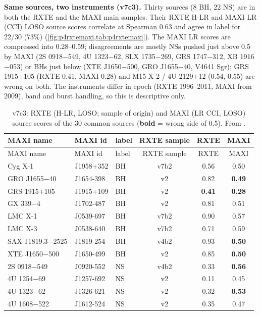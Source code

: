\textbf{Same sources, two instruments (v7c3).} \Descriptive{} Thirty sources (8 BH, 22 NS) are in both the RXTE and the MAXI
main samples. Their RXTE H-LR and MAXI LR (CCI) LOSO source scores correlate at Spearman 0.63 and agree in label for 22/30 (73\%)
(\cref{fig:p4rxtemaxi,tab:p4rxtemaxi}). The MAXI LR scores are compressed into 0.28--0.59; disagreements are mostly NSs pushed
just above 0.5 by MAXI (2S 0918$-$549, 4U 1323$-$62, SLX 1735$-$269, GRS 1747$-$312, XB 1916$-$053) or BHs just below
(XTE J1650$-$500, GRO J1655$-$40, V4641 Sgr); GRS 1915+105 (RXTE 0.41, MAXI 0.28) and M15 X-2 / 4U 2129+12 (0.54, 0.55) are wrong on
both. The instruments differ in epoch (RXTE 1996--2011, MAXI from 2009), band and burst handling, so this is descriptive only.

{\footnotesize
\begin{longtable}{@{}lllccc@{}}
\caption[RXTE vs MAXI]{v7c3: RXTE (H-LR, LOSO; sample of origin) and MAXI (LR CCI, LOSO) source scores of the 30 common sources
(\textbf{bold} = wrong side of 0.5). From .}\label{tab:p4rxtemaxi}\\
\toprule
MAXI name & MAXI id & label & RXTE sample & RXTE & MAXI \\
\midrule\endfirsthead
\toprule MAXI name & MAXI id & label & RXTE sample & RXTE & MAXI \\ \midrule\endhead
\bottomrule\endfoot
Cyg X-1 & J1958+352 & BH & v7b2 & 0.56 & 0.50 \\
GRO J1655$-$40 & J1654-398 & BH & v2 & 0.82 & \textbf{0.49} \\
GRS 1915+105 & J1915+109 & BH & v2 & \textbf{0.41} & \textbf{0.28} \\
GX 339$-$4 & J1702-487 & BH & v2 & 0.81 & 0.51 \\
LMC X-1 & J0539-697 & BH & v7b2 & 0.90 & 0.57 \\
LMC X-3 & J0538-640 & BH & v7b2 & 0.71 & 0.59 \\
SAX J1819.3$-$2525 & J1819-254 & BH & v4b2 & 0.93 & \textbf{0.50} \\
XTE J1650$-$500 & J1650-499 & BH & v2 & 0.85 & \textbf{0.50} \\
2S 0918$-$549 & J0920-552 & NS & v4b2 & 0.33 & \textbf{0.56} \\
4U 1254$-$69 & J1257-692 & NS & v2 & 0.11 & 0.45 \\
4U 1323$-$62 & J1326-621 & NS & v2 & 0.32 & \textbf{0.53} \\
4U 1608$-$522 & J1612-524 & NS & v2 & 0.35 & 0.47 \\

\end{longtable}}
